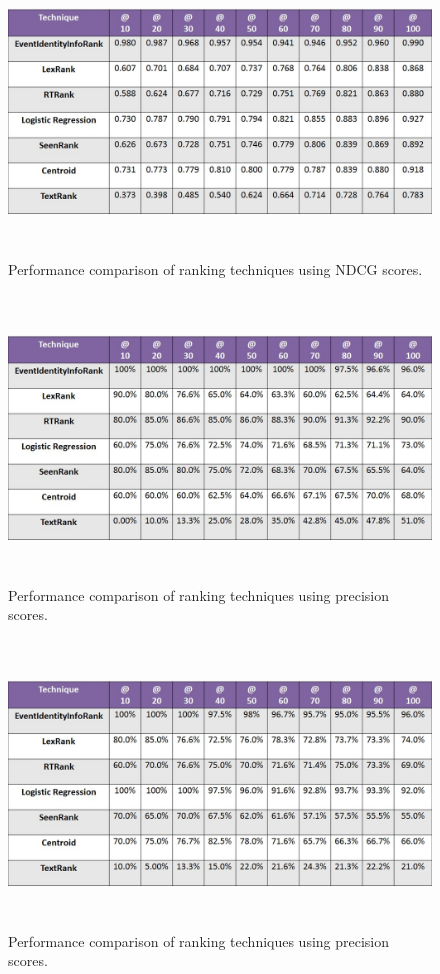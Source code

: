 \begin{figure}[htbp]
\centering
\includegraphics[height=3in,width=5.5in]{Figures/sydneysiegecorrectedndcg.jpg}
\caption{\small Performance comparison of ranking techniques using NDCG scores.}
\label{sydneysiegendcgtable}
\end{figure}

\begin{figure}[htbp]
\centering
\includegraphics[height=3in,width=5.5in]{Figures/MillionsMarchNycCorrectedPrecision.jpg}
\caption{\small Performance comparison of ranking techniques using precision scores.}
\label{millionsmarchnycprecisiontable}
\end{figure}

\begin{figure}[htbp]
\centering
\includegraphics[height=3in,width=5.5in]{Figures/sydneysiegeprecisioncorrected.jpg}
\caption{\small Performance comparison of ranking techniques using precision scores.}
\label{sydneysiegeprecisiontable}
\end{figure}

